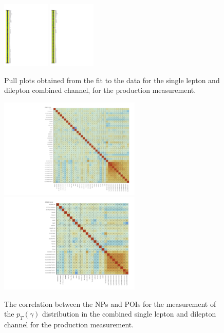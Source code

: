 \begin{figure}[ht]
  \centering
  \includegraphics[width=0.20\textwidth]{figures/diff_xsec/ljet_dilep_combination_mu_blinded/compare_NP_pulls/tty_combi_NP_pull_ph_pt.pdf}
  \quad\quad
  \includegraphics[width=0.20\textwidth]{figures/diff_xsec/ljet_dilep_combination_mu_blinded/compare_NP_pulls/tty_combi_NP_pull_ph_eta.pdf}
  \caption{Pull plots obtained from the fit to the data for the single lepton and dilepton combined channel, for the \tty production measurement.}
  \label{fig:pull_plot_pt_sldl_mu_blinded_tty_prod}
\end{figure}
\FloatBarrier

\begin{figure}[ht]
  \centering
  \includegraphics[width=0.6\textwidth]{figures/diff_xsec/ljet_dilep_combination_mu_blinded/correlations/tty_combi_corr_ph_pt.pdf}
  \quad\quad
  \includegraphics[width=0.6\textwidth]{figures/diff_xsec/ljet_dilep_combination_mu_blinded/correlations/tty_combi_corr_ph_eta.pdf}
  \caption{The correlation between the NPs and POIs for the measurement of 
  the $p_T(\gamma)$ distribution in the combined single lepton and dilepton channel for the \tty production measurement.}
  \label{fig:NP-corr_sldl_mu_blinded_tty_prod}
\end{figure}
\FloatBarrier

